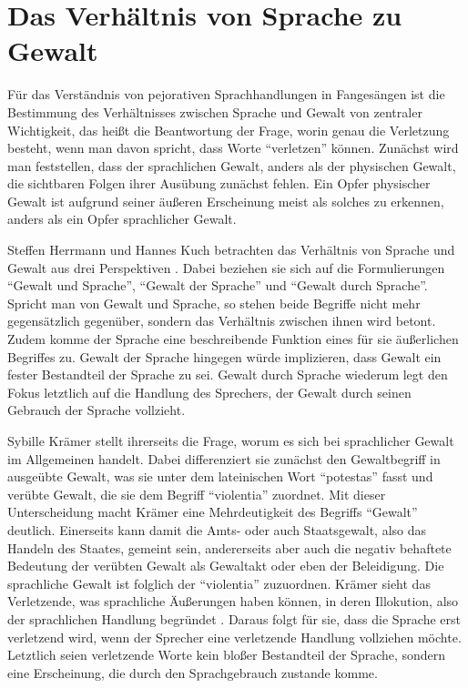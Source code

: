 \section{Das Verhältnis von Sprache zu Gewalt}
Für das Verständnis von pejorativen Sprachhandlungen in Fangesängen ist die Bestimmung des Verhältnisses zwischen Sprache und Gewalt von zentraler Wichtigkeit, das heißt die Beantwortung der Frage, worin genau die Verletzung besteht, wenn man davon spricht, dass Worte "`verletzen"' können.
Zunächst wird man feststellen, dass der sprachlichen Gewalt, anders als der physischen Gewalt, die sichtbaren Folgen ihrer Ausübung zunächst fehlen.
Ein Opfer physischer Gewalt ist aufgrund seiner äußeren Erscheinung meist als solches zu erkennen, anders als ein Opfer sprachlicher Gewalt.

Steffen Herrmann und Hannes Kuch betrachten das Verhältnis von Sprache und Gewalt aus drei Perspektiven \cite[S. 13]{SKH07}.
Dabei beziehen sie sich auf die Formulierungen "`Gewalt und Sprache"', "`Gewalt der Sprache"' und "`Gewalt durch Sprache"'.
Spricht man von Gewalt und Sprache, so stehen beide Begriffe nicht mehr gegensätzlich gegenüber, sondern das Verhältnis zwischen ihnen wird betont.
Zudem komme der Sprache eine beschreibende Funktion eines für sie äußerlichen Begriffes zu.
Gewalt der Sprache hingegen würde implizieren, dass Gewalt ein fester Bestandteil der Sprache zu sei.
Gewalt durch Sprache wiederum legt den Fokus letztlich auf die Handlung des Sprechers, der Gewalt durch seinen Gebrauch der Sprache vollzieht.

Sybille Krämer stellt ihrerseits die Frage, worum es sich bei sprachlicher Gewalt im Allgemeinen handelt.
Dabei differenziert sie zunächst den Gewaltbegriff in ausgeübte Gewalt, was sie unter dem lateinischen Wort "`potestas"' fasst und verübte Gewalt, die sie dem Begriff "`violentia"' zuordnet.
Mit dieser Unterscheidung macht Krämer eine Mehrdeutigkeit des Begriffs "`Gewalt"' deutlich.
Einerseits kann damit die Amts- oder auch Staatsgewalt, also das Handeln des Staates, gemeint sein, andererseits aber auch die negativ behaftete Bedeutung der verübten Gewalt als Gewaltakt oder eben der Beleidigung.
Die sprachliche Gewalt ist folglich der "`violentia"' zuzuordnen.
Krämer sieht das Verletzende, was sprachliche Äußerungen haben können, in deren Illokution, also der sprachlichen Handlung begründet \cite[S. 35]{SK07}.
Daraus folgt für sie, dass die Sprache erst verletzend wird, wenn der Sprecher eine verletzende Handlung vollziehen möchte.
Letztlich seien verletzende Worte kein bloßer Bestandteil der Sprache, sondern eine Erscheinung, die durch den Sprachgebrauch zustande komme.

